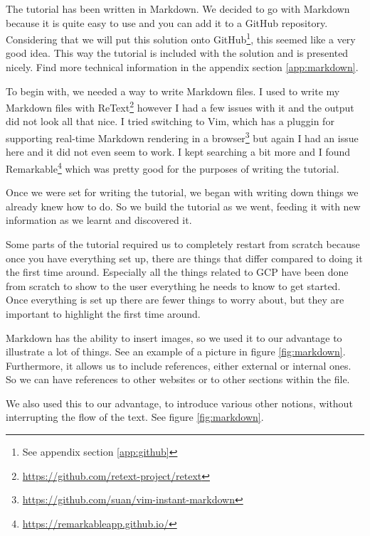 
The tutorial has been written in Markdown. We decided to go with
Markdown because it is quite easy to use and you can add it to a
GitHub repository.  Considering that we will put this solution onto
GitHub\footnote{See appendix section \ref{app:github}}, this seemed
like a very good idea. This way the tutorial is included with the
solution and is presented nicely. Find more technical information in
the appendix section \ref{app:markdown}.

To begin with, we needed a way to write Markdown files. I used to
write my Markdown files with
ReText\footnote{\url{https://github.com/retext-project/retext}}
however I had a few issues with it and the output did not look all
that nice. I tried switching to Vim, which has a pluggin for
supporting real-time Markdown rendering in a
browser\footnote{\url{https://github.com/suan/vim-instant-markdown}}
but again I had an issue here and it did not even seem to work. I kept
searching a bit more and I found
Remarkable\footnote{\url{https://remarkableapp.github.io/}} which was
pretty good for the purposes of writing the tutorial.

Once we were set for writing the tutorial, we began with writing down
things we already knew how to do. So we build the tutorial as we went,
feeding it with new information as we learnt and discovered it.

Some parts of the tutorial required us to completely restart from
scratch because once you have everything set up, there are things that
differ compared to doing it the first time around. Especially all the
things related to GCP have been done from scratch to show to the user
everything he needs to know to get started. Once everything is set up
there are fewer things to worry about, but they are important to
highlight the first time around.

Markdown has the ability to insert images, so we used it to our
advantage to illustrate a lot of things. See an example of a picture
in figure \ref{fig:markdown}. Furthermore, it allows us to include
references, either external or internal ones. So we can have
references to other websites or to other sections within the file.

We also used this to our advantage, to introduce various other
notions, without interrupting the flow of the text. See figure
\ref{fig:markdown}.

